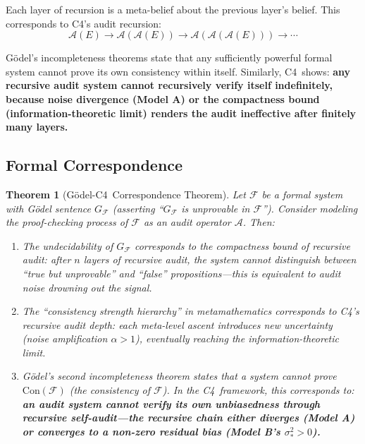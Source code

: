 \documentclass[12pt,a4paper]{article}
\newtheorem{theorem}{Theorem}[section]
\theoremstyle{definition}
\newcommand{\Cfour}{\textsc{C4}}
\newcommand{\AuditOp}{\mathcal{A}}
\begin{document}
Each layer of recursion is a meta-belief about the previous layer's belief. This corresponds to \Cfour's audit recursion:
\begin{equation*}
    \AuditOp(E) \to \AuditOp(\AuditOp(E)) \to \AuditOp(\AuditOp(\AuditOp(E))) \to \cdots
\end{equation*}

G\"{o}del's incompleteness theorems state that any sufficiently powerful formal system cannot prove its own consistency within itself. Similarly, \Cfour\ shows: \textbf{any recursive audit system cannot recursively verify itself indefinitely, because noise divergence (Model A) or the compactness bound (information-theoretic limit) renders the audit ineffective after finitely many layers.}

\subsection{Formal Correspondence}

\begin{theorem}[G\"{o}del-\Cfour\ Correspondence Theorem]\label{thm:godel_c4}
Let $\mathcal{F}$ be a formal system with G\"{o}del sentence $G_{\mathcal{F}}$ (asserting ``$G_{\mathcal{F}}$ is unprovable in $\mathcal{F}$''). Consider modeling the proof-checking process of $\mathcal{F}$ as an audit operator $\AuditOp$. Then:

\begin{enumerate}[label=(\alph*), leftmargin=*]
    \item The undecidability of $G_{\mathcal{F}}$ corresponds to the compactness bound of recursive audit: after $n$ layers of recursive audit, the system cannot distinguish between ``true but unprovable'' and ``false'' propositions---this is equivalent to audit noise drowning out the signal.

    \item The ``consistency strength hierarchy'' in metamathematics corresponds to \Cfour's recursive audit depth: each meta-level ascent introduces new uncertainty (noise amplification $\alpha > 1$), eventually reaching the information-theoretic limit.

    \item G\"{o}del's second incompleteness theorem states that a system cannot prove $\mathrm{Con}(\mathcal{F})$ (the consistency of $\mathcal{F}$). In the \Cfour\ framework, this corresponds to: \textbf{an audit system cannot verify its own unbiasedness through recursive self-audit---the recursive chain either diverges (Model A) or converges to a non-zero residual bias (Model B's $\sigma_*^2 > 0$).}
\end{enumerate}
\end{theorem}
\end{document}
